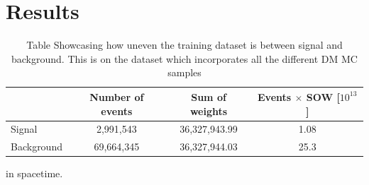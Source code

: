 \documentclass[14pt, a4paper]{book}
\begin{document}
\part{Results}

\begin{table}[!h]
    \centering
    \begin{tabular}{l|c|c|c}\midrule\midrule
                    & Number of events & Sum of weights & Events $\times$ SOW [$10^{13}$]\\\midrule
         Signal     & 2,991,543        & 36,327,943.99  & 1.08\\
         Background & 69,664,345       & 36,327,944.03  & 25.3 \\ \midrule\midrule
    \end{tabular}
    \caption[Unbalanced DM training dataset]{Table Showcasing how uneven the training dataset is between signal and background. This is on the dataset which incorporates all the different DM MC samples}
    \label{tab:UnbalancedDMTraining}
\end{table}
in spacetime.

\end{document}
